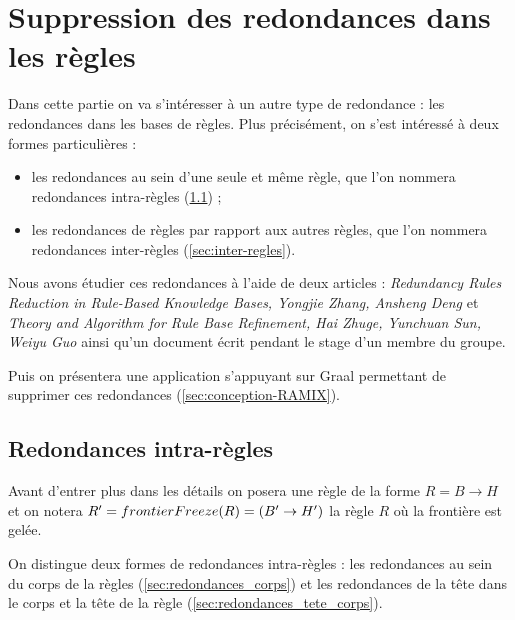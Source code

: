 \section{Suppression des redondances dans les règles}\label{sec:regles}

\par Dans cette partie on va s'intéresser à un autre type de redondance : les redondances dans les bases de règles. Plus précisément, on s'est intéressé à deux formes particulières : 
\begin{itemize}
    \item les redondances au sein d'une seule et même règle, que l'on nommera redondances intra-règles (\ref{sec:intra-regles}) ;
    \item les redondances de règles par rapport aux autres règles, que l'on nommera redondances inter-règles (\ref{sec:inter-regles}).
\end{itemize}
Nous avons étudier ces redondances à l'aide de deux articles : \textit{Redundancy Rules Reduction in Rule-Based Knowledge Bases, Yongjie Zhang, Ansheng Deng} \cite{DBLP:conf/fskd/2015} et \textit{Theory and Algorithm for Rule Base Refinement, Hai Zhuge, Yunchuan Sun, Weiyu Guo} \cite{DBLP:conf/ieaaie/2003} ainsi qu'un document \cite{MINIREGLE} écrit pendant le stage d'un membre du groupe.
\par Puis on présentera une application s'appuyant sur Graal permettant de supprimer ces redondances (\ref{sec:conception-RAMIX}).


\subsection{Redondances intra-règles}\label{sec:intra-regles}
\par Avant d'entrer plus dans les détails on posera une règle de la forme $R = B \rightarrow H$ et on notera $R' = \linebreak frontierFreeze(R) =  (B' \rightarrow H')$ la règle $R$ où la frontière est gelée. 
\par On distingue deux formes de redondances intra-règles : les redondances au sein du corps de la règles (\ref{sec:redondances_corps}) et les redondances de la tête dans le corps et la tête de la règle (\ref{sec:redondances_tete_corps}).

